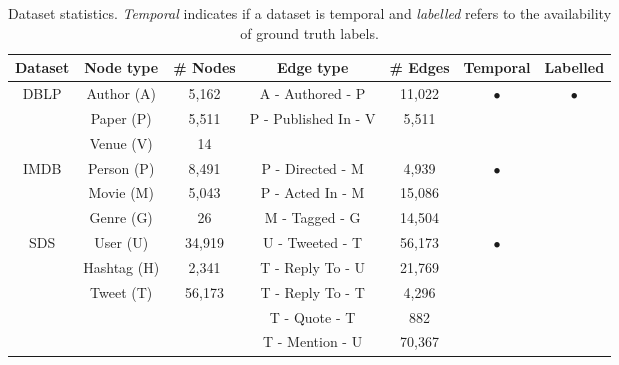 \begin{table}[ht!]
\centering
\caption{
Dataset statistics. 
\textit{Temporal} indicates if a dataset is temporal and \textit{labelled} refers to the availability of ground truth labels.  
}
\label{tab:datasets}
\small
\begin{tabular}{@{}ccccccc@{}}
    \toprule
    Dataset                 & Node type     & \# Nodes  & Edge type             & \# Edges  & Temporal                      & Labelled \\
    \midrule
    \multirow{3}{*}{DBLP}   & Author (A)    & 5,162     & A - Authored - P      & 11,022    & \multirow{3}{*}{$\bullet$}    & \multirow{3}{*}{$\bullet$}\\
                            & Paper (P)     & 5,511     & P - Published In - V  & 5,511     &                               &                           \\
                            & Venue (V)     & 14        &                       &           &                               &                           \\ \midrule
    \multirow{3}{*}{IMDB}   & Person (P)    & 8,491     & P - Directed - M      & 4,939     & \multirow{3}{*}{$\bullet$}    & \multirow{3}{*}{}         \\ 
                            & Movie (M)     & 5,043     & P - Acted In - M      & 15,086    &                               &                           \\
                            & Genre (G)     & 26        & M - Tagged   - G      & 14,504    &                               &                           \\ \midrule
    \multirow{7}{*}{SDS}    & User (U)      & 34,919    & U - Tweeted  - T      & 56,173    & \multirow{7}{*}{$\bullet$}    & \multirow{7}{*}{}         \\ 
                            & Hashtag (H)   & 2,341     & T - Reply To - U      & 21,769    &                               &                           \\
                            & Tweet (T)     & 56,173    & T - Reply To - T      & 4,296     &                               &                           \\
                            &               &           & T - Quote    - T      & 882       &                               &                           \\
                            &               &           & T - Mention  - U      & 70,367    &                               &                           \\

\end{tabular}
\end{table}
